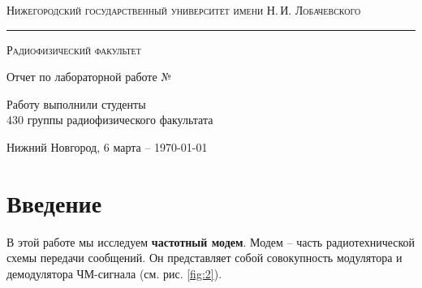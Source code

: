 \begin{titlepage}
\begin{center}

{\textsc{Нижегородский государственный университет имени Н.\,И. Лобачевского}}
\vskip 2pt \hrule \vskip 3pt
{\textsc{Радиофизический факультет}}

\vfill


{{\LARGE Отчет по лабораторной работе №\labnumber}\vskip 12pt {\Huge \bfseries \labtheme}}

	
\vspace{2cm}
{\large Работу выполнили студенты \\[-0.25em] 430 группы радиофизического факультата \\[0.5em] {\Large \bfseries \labauthor}}



\end{center}

\vfill
	
	
	
\begin{center}
	{Нижний Новгород, 6 марта -- \today}
\end{center}

\end{titlepage}
\tableofcontents
\newpage 
\section*{Введение}


В этой работе мы исследуем \textbf{частотный модем}. Модем -- часть радиотехнической схемы передачи сообщений. Он представляет собой совокупность модулятора и демодулятора ЧМ-сигнала (см. рис. \ref{fig:2}). 

